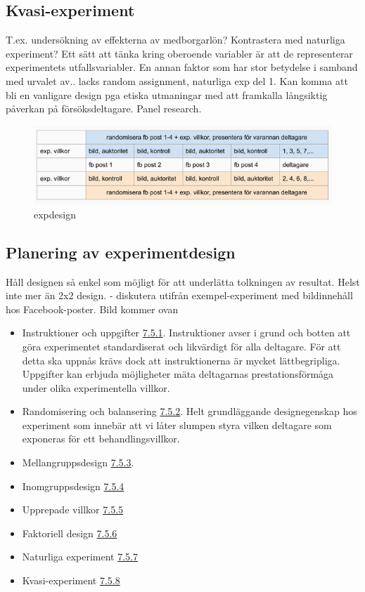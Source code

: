 \documentclass[
]{book}
\begin{document}
\hypertarget{sub07.5.8}{%
\subsection{Kvasi-experiment}\label{sub07.5.8}}

T.ex. undersökning av effekterna av medborgarlön? Kontrastera med naturliga experiment? Ett sätt att tänka kring oberoende variabler är att de representerar experimentets utfallsvariabler. En annan faktor som har stor betydelse i samband med urvalet av.. lacks random assignment, naturliga exp del 1. Kan komma att bli en vanligare design pga etiska utmaningar med att framkalla långsiktig påverkan på försöksdeltagare. Panel research.

\begin{figure}
\centering
\includegraphics{../fig/design.png}
\caption{expdesign}
\end{figure}

\hypertarget{sub07.5.9}{%
\subsection{Planering av experimentdesign}\label{sub07.5.9}}

Håll designen så enkel som möjligt för att underlätta tolkningen av resultat. Helst inte mer än 2x2 design. - diskutera utifrån exempel-experiment med bildinnehåll hos Facebook-poster. Bild kommer ovan

\begin{itemize}
\item
  Instruktioner och uppgifter \protect\hyperlink{sub07.5.1}{7.5.1}. Instruktioner avser i grund och botten att göra experimentet standardiserat och likvärdigt för alla deltagare. För att detta ska uppnås krävs dock att instruktionerna är mycket lättbegripliga. Uppgifter kan erbjuda möjligheter mäta deltagarnas prestationsförmåga under olika experimentella villkor.
\item
  Randomisering och balansering \protect\hyperlink{sub07.5.2}{7.5.2}. Helt grundläggande designegenskap hos experiment som innebär att vi låter slumpen styra vilken deltagare som exponeras för ett behandlingsvillkor.
\item
  Mellangruppsdesign \protect\hyperlink{sub07.5.3}{7.5.3}.
\item
  Inomgruppsdesign \protect\hyperlink{sub07.5.4}{7.5.4}
\item
  Upprepade villkor \protect\hyperlink{sub07.5.5}{7.5.5}
\item
  Faktoriell design \protect\hyperlink{sub07.5.6}{7.5.6}
\item
  Naturliga experiment \protect\hyperlink{sub07.5.7}{7.5.7}
\item
  Kvasi-experiment \protect\hyperlink{sub07.5.8}{7.5.8}
\end{itemize}
\end{document}
